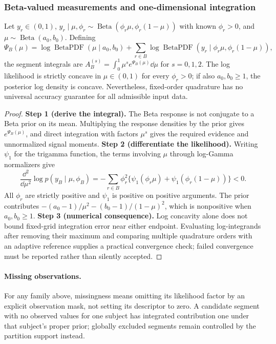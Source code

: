 \subsubsection{Beta-valued measurements and one-dimensional integration}
\begin{proposition}
\label{prop:beta-response-family}
Let $y_r\in(0,1)$, $y_r\mid\mu,\phi_r\sim\operatorname{Beta}(\phi_r\mu,\phi_r(1-\mu))$ with known $\phi_r>0$, and $\mu\sim\operatorname{Beta}(a_0,b_0)$. Defining
\[
\Psi_B(\mu)=\log\operatorname{BetaPDF}(\mu\mid a_0,b_0)
+\sum_{r\in B}\log\operatorname{BetaPDF}(y_r\mid\phi_r\mu,\phi_r(1-\mu)),
\]
the segment integrals are $A^{(s)}_B=\int_0^1\mu^s e^{\Psi_B(\mu)}\dd\mu$ for $s=0,1,2$. The log likelihood is strictly concave in $\mu\in(0,1)$ for every $\phi_r>0$; if also $a_0,b_0\ge1$, the posterior log density is concave. Nevertheless, fixed-order quadrature has no universal accuracy guarantee for all admissible input data.
\end{proposition}
\begin{proof}
\textbf{Step 1 (derive the integral).}
The Beta response is not conjugate to a Beta prior on its mean. Multiplying the response densities by the prior gives $e^{\Psi_B(\mu)}$, and direct integration with factors $\mu^s$ gives the required evidence and unnormalized signal moments.
\textbf{Step 2 (differentiate the likelihood).}
Writing $\psi_1$ for the trigamma function, the terms involving $\mu$ through log-Gamma normalizers give
\[
\frac{\dd^2}{\dd\mu^2}\log p(y_B\mid\mu,\phi_B)
=-\sum_{r\in B}\phi_r^2\{\psi_1(\phi_r\mu)+\psi_1(\phi_r(1-\mu))\}<0.
\]
All $\phi_r$ are strictly positive and $\psi_1$ is positive on positive arguments. The prior contributes $-(a_0-1)/\mu^2-(b_0-1)/(1-\mu)^2$, which is nonpositive when $a_0,b_0\ge1$.
\textbf{Step 3 (numerical consequence).}
Log concavity alone does not bound fixed-grid integration error near either endpoint. Evaluating log-integrands after removing their maximum and comparing multiple quadrature orders with an adaptive reference supplies a practical convergence check; failed convergence must be reported rather than silently accepted.
\end{proof}

\paragraph{Missing observations.}
For any family above, missingness means omitting its likelihood factor by an explicit observation mask, not setting its descriptor to zero. A candidate segment with no observed values for one subject has integrated contribution one under that subject's proper prior; globally excluded segments remain controlled by the partition support instead.
